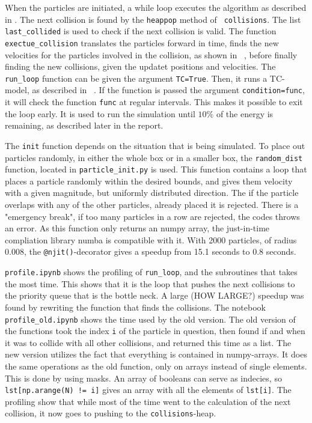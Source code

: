\documentclass{article}
\begin{document}
        When the particles are initiated, a while loop executes the algorithm as described in \cite{exercise}. The next collision is found by the \verb|heappop| method of \verb| collisions|. The list \verb|last_collided| is used to check if the next collision is valid. The function \verb|exectue_collision| translates the particles forward in time, finds the new velocities for the particles involved in the collision, as shown in ~\cite{exercise}, before finally finding the new collisions, given the updatet positions and velocities. The \verb|run_loop| function can be given the argument \verb|TC=True|. Then, it runs a TC-model, as described in ~\cite{TC}. If the function is passed the argument \verb|condition=func|, it will check the function \verb|func| at regular intervals. This makes it possible to exit the loop early. It is used to run the simulation until $10\%$ of the energy is remaining, as described later in the report.

        The \verb|init| function depends on the situation that is being simulated. To place out particles randomly, in either the whole box or in a smaller box, the \verb|random_dist| function, located in \verb|particle_init.py| is used. This function contains a loop that places a particle randomly within the desired bounds, and gives them velocity with a given magnitude, but uniformly distributed direction. The if the particle overlaps with any of the other particles, already placed it is rejected. There is a "emergency break", if too many particles in a row are rejected, the codes throws an error. As this function only returns an numpy array, the just-in-time compliation library numba is compatible with it. With 2000 particles, of radius 0.008, the \verb|@njit()|-decorator gives a speedup from 15.1 seconds to 0.8 seconds.

        \verb|profile.ipynb| shows the profiling of \verb|run_loop|, and the subroutines that takes the most time. This shows that it is the loop that pushes the next collisions to the priority queue that is the bottle neck. A large (HOW LARGE?) speedup was found by rewriting the function that finds the collisions. The notebook \verb|profile_old.ipynb| shows the time used by the old version. The old version of the functions took the index \verb|i| of the particle in question, then found if and when it was to collide with all other collisions, and returned this time as a list. The new version utilizes the fact that everything is contained in numpy-arrays. It does the same operations as the old function, only on arrays instead of single elements. This is done by using masks. An array of booleans can serve as indecies, so \verb|lst[np.arange(N) != i]| gives an array with all the elements of \verb|lst[i]|. The profiling show that while most of the time went to the calculation of the next collision, it now goes to pushing to the \verb|collisions|-heap.
\end{document}
